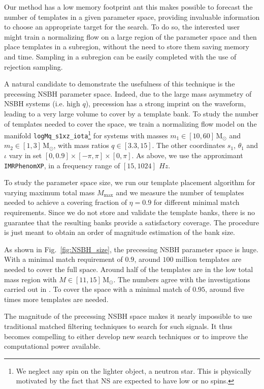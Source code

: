 \documentclass[twocolumn,showpacs,preprintnumbers,nofootinbib,prd,
superscriptaddress,10pt]{revtex4-2}
\begin{document}
Our method has a low memory footprint ant this makes possible to forecast the number of templates in a given parameter space, providing invaluable information to choose an appropriate target for the search.
To do so, the interested user might train a normalizing flow on a large region of the parameter space and then place templates in a subregion, without the need to store them saving memory and time. Sampling in a subregion can be easily completed with the use of rejection sampling.

A natural candidate to demonstrate the usefulness of this technique is the precessing NSBH parameter space.
Indeed, due to the large mass asymmetry of NSBH systems (i.e. high $q$), precession has a strong imprint on the waveform, leading to a very large volume to cover by a template bank.
To study the number of templates needed to cover the space, we train a normalizing flow model on the manifold \texttt{logMq\_s1xz\_iota}\footnote{We neglect any spin on the lighter object, a neutron star. This is physically motivated by the fact that NS are expected to have low or no spins.} for systems with masses $m_1 \in [10, 60]\,\mathrm{M_\odot}$ and  $m_2 \in [1, 3]\,\mathrm{M_\odot}$, with mass ratios $q \in [3.3, 15]$.
The other coordinates $s_\text{1}$, $\theta_\text{1}$ and $\iota$ vary in set $[0, 0.9]\times[-\pi, \pi]\times[0, \pi]$.
As above, we use the approximant \texttt{IMRPhenomXP}, in a frequency range of $[15, 1024]\,\SI{}{Hz}$.

To study the parameter space size, we run our template placement algorithm for varying maximum total mass $M_\text{max}$ and we measure the number of templates needed to achieve a covering fraction of $\eta = 0.9$ for different minimal match requirements.
Since we do not store and validate the template banks, there is no guarantee that the resulting banks provide a satisfactory coverage. The procedure is just meant to obtain an order of magnitude estimation of the bank size.

As shown in Fig.~\ref{fig:NSBH_size}, the precessing NSBH parameter space is huge. With a minimal match requirement of $0.9$, around $100$ million templates are needed to cover the full space. Around half of the templates are in the low total mass region with ${M \in [11,15]\,\mathrm{M_\odot}}$. The numbers agree with the investigations carried out in \cite{McIsaac:2023ijd}.
To cover the space with a minimal match of $0.95$, around five times more templates are needed.

The magnitude of the precessing NSBH space makes it nearly impossible to use traditional matched filtering techniques to search for such signals. It thus becomes compelling to either develop new search techniques \cite{McIsaac:2023ijd} or to improve the computational power available.
\end{document}
